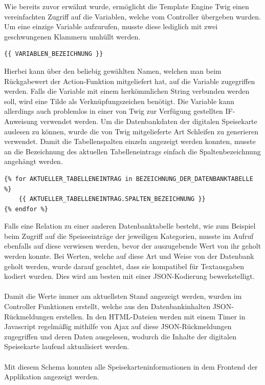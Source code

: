 Wie bereits zuvor erwähnt wurde, ermöglicht die Template Engine Twig einen vereinfachten Zugriff auf die Variablen, welche vom Controller übergeben wurden. Um eine einzige Variable aufzurufen, musste diese lediglich mit zwei geschwungenen Klammern umhüllt werden. 
\lstset{language = php}
  	\begin{lstlisting}
{{ VARIABLEN_BEZEICHNUNG }}
\end{lstlisting}
Hierbei kann über den beliebig gewählten Namen, welchen man beim Rückgabewert der Action-Funktion mitgeliefert hat, auf die Variable zugegriffen werden. 
Falls die Variable mit einem herkömmlichen String verbunden werden soll, wird eine Tilde als Verknüpfungszeichen benötigt. 
Die Variable kann allerdings auch problemlos in einer von Twig zur Verfügung gestellten IF-Anweisung verwendet werden.
Um die Datenbankdaten der digitalen Speisekarte auslesen zu können, wurde die von Twig mitgelieferte Art Schleifen zu generieren verwendet. Damit die Tabellenspalten einzeln angezeigt werden konnten, musste an die Bezeichnung des aktuellen Tabelleneintrags einfach die Spaltenbezeichnung angehängt werden. 
\lstset{language = php}
  	\begin{lstlisting}
{% for AKTUELLER_TABELLENEINTRAG in BEZEICHNUNG_DER_DATENBANKTABELLE %}
	{{ AKTUELLER_TABELLENEINTRAG.SPALTEN_BEZEICHNUNG }}
{% endfor %}
	\end{lstlisting}
Falls eine Relation zu einer anderen Datenbanktabelle besteht, wie zum Beispiel beim Zugriff auf die Speiseeinträge der jeweiligen Kategorien, musste im Aufruf ebenfalls auf diese verwiesen werden, bevor der auszugebende Wert von ihr geholt werden konnte.
Bei Werten, welche auf diese Art und Weise von der Datenbank geholt werden, wurde darauf geachtet, dass sie kompatibel für Textausgaben kodiert wurden. Dies wird am besten mit einer JSON-Kodierung bewerkstelligt.
\\ \\
Damit die Werte immer am aktuellsten Stand angezeigt werden, wurden im Controller Funktionen erstellt, welche aus den Datenbankinhalten JSON-Rückmeldungen erstellen.
In den HTML-Dateien werden mit einem Timer in Javascript regelmäßig mithilfe von Ajax auf diese JSON-Rückmeldungen zugegriffen und deren Daten ausgelesen, wodurch die Inhalte der digitalen Speisekarte laufend aktualisiert werden.
\\ \\
Mit diesem Schema konnten alle Speisekarteninformationen in dem Frontend der Applikation angezeigt werden.


